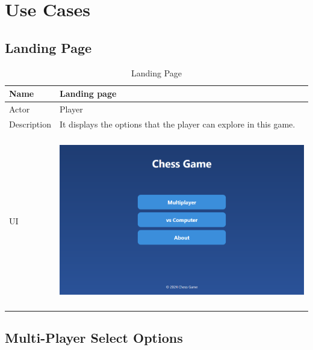 \documentclass[a4paper,12pt]{article}
\begin{document}
\section{Use Cases}

\subsection{Landing Page}

\begin{longtable}{|m{}|m{}|}
    \caption{Landing Page} \\
    \hline
    Name & Landing page \\
    \hline
    Actor & Player \\
    \hline
    Description & It displays the options that the player can explore in this game. \\ 
    \hline
    \centering UI & 
    \begin{center}
        \includegraphics[height=2.7in]{Images/Use Cases/landingPage.png}
    \end{center} \\ 
    \hline
\end{longtable}

\subsection{Multi-Player Select Options}
\end{document}
